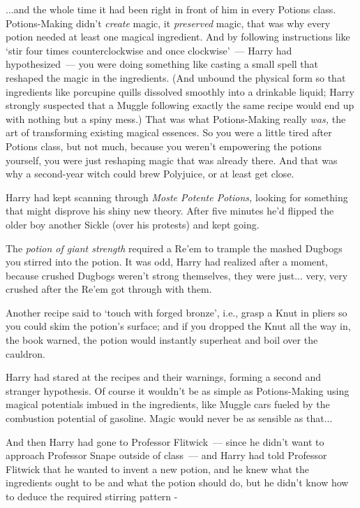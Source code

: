 ...and the whole time it had been right in front of him in every Potions class. Potions-Making didn't \emph{create} magic, it \emph{preserved} magic, that was why every potion needed at least one magical ingredient. And by following instructions like `stir four times counterclockwise and once clockwise'~--- Harry had hypothesized~--- you were doing something like casting a small spell that reshaped the magic in the ingredients. (And unbound the physical form so that ingredients like porcupine quills dissolved smoothly into a drinkable liquid; Harry strongly suspected that a Muggle following exactly the same recipe would end up with nothing but a spiny mess.) That was what Potions-Making really \emph{was,} the art of transforming existing magical essences. So you were a little tired after Potions class, but not much, because you weren't empowering the potions yourself, you were just reshaping magic that was already there. And that was why a second-year witch could brew Polyjuice, or at least get close.

Harry had kept scanning through \emph{Moste Potente Potions,} looking for something that might disprove his shiny new theory. After five minutes he'd flipped the older boy another Sickle (over his protests) and kept going.

The \emph{potion of giant strength} required a Re'em to trample the mashed Dugbogs you stirred into the potion. It was odd, Harry had realized after a moment, because crushed Dugbogs weren't strong themselves, they were just... very, very crushed after the Re'em got through with them.

Another recipe said to `touch with forged bronze', i.e., grasp a Knut in pliers so you could skim the potion's surface; and if you dropped the Knut all the way in, the book warned, the potion would instantly superheat and boil over the cauldron.

Harry had stared at the recipes and their warnings, forming a second and stranger hypothesis. Of course it wouldn't be as simple as Potions-Making using magical potentials imbued in the ingredients, like Muggle cars fueled by the combustion potential of gasoline. Magic would never be as sensible as that...

And then Harry had gone to Professor Flitwick~--- since he didn't want to approach Professor Snape outside of class~--- and Harry had told Professor Flitwick that he wanted to invent a new potion, and he knew what the ingredients ought to be and what the potion should do, but he didn't know how to deduce the required stirring pattern -

